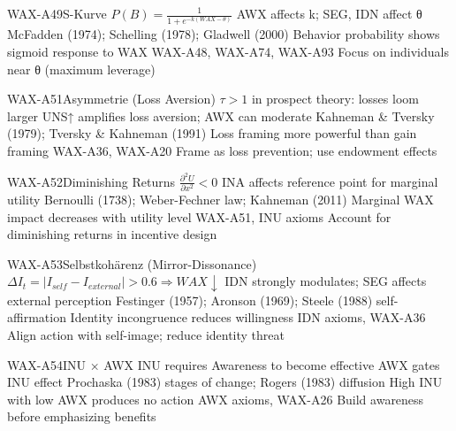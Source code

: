 \begin{axiomspec}{WAX-A49}{S-Kurve}
 $P(B) = \frac{1}{1 + e^{-k(WAX - \theta)}}$
 AWX affects k; SEG, IDN affect θ
 McFadden (1974); Schelling (1978); Gladwell (2000)
 Behavior probability shows sigmoid response to WAX
 WAX-A48, WAX-A74, WAX-A93
 Focus on individuals near θ (maximum leverage)
\end{axiomspec}

\begin{axiomspec}{WAX-A51}{Asymmetrie (Loss Aversion)}
 $\tau > 1$ in prospect theory: losses loom larger
 UNS↑ amplifies loss aversion; AWX can moderate
 Kahneman \& Tversky (1979); Tversky \& Kahneman (1991)
 Loss framing more powerful than gain framing
 WAX-A36, WAX-A20
 Frame as loss prevention; use endowment effects
\end{axiomspec}

\begin{axiomspec}{WAX-A52}{Diminishing Returns}
 $\frac{\partial^2 U}{\partial x^2} < 0$
 INA affects reference point for marginal utility
 Bernoulli (1738); Weber-Fechner law; Kahneman (2011)
 Marginal WAX impact decreases with utility level
 WAX-A51, INU axioms
 Account for diminishing returns in incentive design
\end{axiomspec}

\begin{axiomspec}{WAX-A53}{Selbstkohärenz (Mirror-Dissonance)}
 $\Delta I_t = |I_{self} - I_{external}| > 0.6 \Rightarrow WAX \downarrow$
 IDN strongly modulates; SEG affects external perception
 Festinger (1957); Aronson (1969); Steele (1988) self-affirmation
 Identity incongruence reduces willingness
 IDN axioms, WAX-A36
 Align action with self-image; reduce identity threat
\end{axiomspec}


\begin{axiomspec}{WAX-A54}{INU × AWX}
 INU requires Awareness to become effective
 AWX gates INU effect
 Prochaska (1983) stages of change; Rogers (1983) diffusion
 High INU with low AWX produces no action
 AWX axioms, WAX-A26
 Build awareness before emphasizing benefits
\end{axiomspec}

